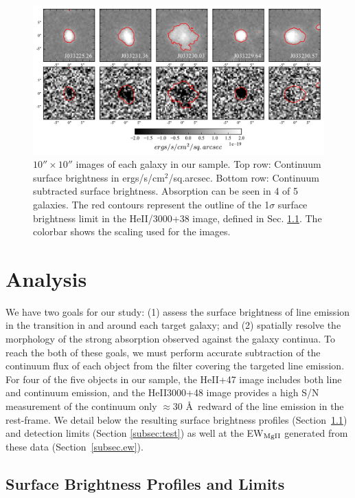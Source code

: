 \documentclass[twocolumn]{aastex61}
\begin{document}
\begin{figure}[!htb]
\centering
\includegraphics[scale=0.7]{../Figures/stamps.pdf}
\caption{ $10'' \times 10''$ images of each galaxy in our sample. Top row: Continuum surface brightness in ergs/s/cm$^2$/sq.arcsec. Bottom row: Continuum subtracted  surface brightness.  Absorption can be seen in 4 of 5 galaxies. The red contours represent the outline of the 1$\sigma$ surface brightness limit in the HeII/3000+38 image, defined in Sec. \ref{sec.sb}. The colorbar shows the scaling used for the  images.}
\label{fig:stamp_images}
\end{figure}

\section{Analysis} \label{sec:analysis}
We have two goals for our study: (1) assess the surface brightness of line emission in the  transition in and around each target galaxy; and (2) spatially resolve the morphology of the strong  absorption observed against the galaxy continua.  To reach the both of these goals, we must perform accurate subtraction of the continuum flux of each object from the filter covering the targeted line emission. For four of the five objects in our sample, the HeII+47 image includes both line and continuum emission, and the HeII3000+48 image provides a high S/N measurement of the continuum only $\approx30$ \AA\ redward of the line emission in the rest-frame. We detail below the resulting surface brightness profiles (Section~\ref{sec.sb}) and detection limits (Section \ref{subsec:test}) as well at the EW$_{\rm{MgII}}$ generated from these data (Section~\ref{subsec.ew}).

\subsection{Surface Brightness Profiles and Limits}\label{sec.sb}
\end{document}
